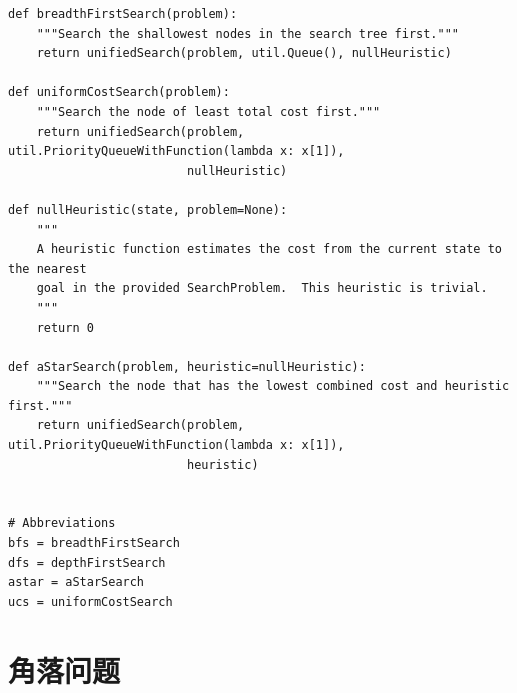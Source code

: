 \documentclass[forprint]{WHUBachelor}
\begin{document}
\begin{verbatim}
def breadthFirstSearch(problem):
    """Search the shallowest nodes in the search tree first."""
    return unifiedSearch(problem, util.Queue(), nullHeuristic)

def uniformCostSearch(problem):
    """Search the node of least total cost first."""
    return unifiedSearch(problem, util.PriorityQueueWithFunction(lambda x: x[1]),
                         nullHeuristic)

def nullHeuristic(state, problem=None):
    """
    A heuristic function estimates the cost from the current state to the nearest
    goal in the provided SearchProblem.  This heuristic is trivial.
    """
    return 0

def aStarSearch(problem, heuristic=nullHeuristic):
    """Search the node that has the lowest combined cost and heuristic first."""
    return unifiedSearch(problem, util.PriorityQueueWithFunction(lambda x: x[1]),
                         heuristic)


# Abbreviations
bfs = breadthFirstSearch
dfs = depthFirstSearch
astar = aStarSearch
ucs = uniformCostSearch
\end{verbatim}

\section{角落问题}
\end{document}
